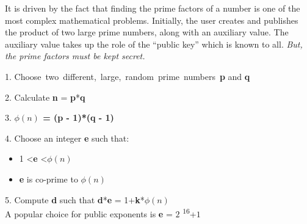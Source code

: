 \documentclass[12 pt]{article}
\begin{document}
\noindent It is driven by the fact that finding the prime factors of a number is one of the most complex mathematical problems. Initially, the user creates and publishes the product of two large prime numbers, along with an auxiliary value. The auxiliary value takes up the role of the ``public key'' which is known to all. \emph{But, the prime factors must be kept secret.}\bigskip

1. Choose\ two\ different,\ large,\ random\  prime\  numbers\ \textbf{p} and \textbf{q}

2. Calculate \textbf{n} = \textbf{p}*\textbf{q}

3. \textbf{\boldmath $\phi(n)$ = (p - 1)*(q - 1)}

4. Choose an integer \textbf{e} such that:

\begin{itemize} \setlength\itemsep{1 em}
 \item  1 \textless \textbf{e} \textless \boldmath$\phi(n)$
 \item \textbf{e} is co-prime to \boldmath$\phi(n)$
\end{itemize}

5. Compute \textbf{d} such that \boldmath \textbf{d}*\textbf{e} = 1+\textbf{k}*\boldmath $\phi(n)$
\bigskip
\\
A popular choice for public exponents is \textbf{e} = $2$ \textsuperscript{$16$}+$1$
\end{document}
